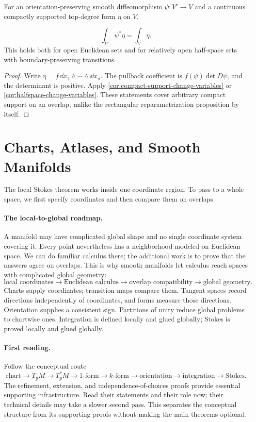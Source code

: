 \begin{proposition}
\label{prop:open-form-invariance}
For an orientation-preserving smooth diffeomorphism $\psi:V'\to V$ and
a continuous compactly supported top-degree form $\eta$ on $V$,

\[
\int_{V'}\psi^*\eta=\int_V\eta.
\]
 This holds both for open Euclidean sets
and for relatively open half-space sets with boundary-preserving transitions.
\end{proposition}
\begin{proof}
Write $\eta=f\,\dd x_1\wedge\cdots\wedge\dd x_n$.
The pullback coefficient is $f(\psi)\det D\psi$, and the determinant is
positive. Apply \cref{cor:compact-support-change-variables} or
\cref{cor:halfspace-change-variables}. These statements cover arbitrary
compact support on an overlap, unlike the rectangular reparametrization
proposition by itself.
\end{proof}

\section{Charts, Atlases, and Smooth Manifolds}
\label{sec:charts-atlases}
The local Stokes theorem works inside one coordinate region. To pass to a
whole space, we first specify coordinates and then compare them on overlaps.

\paragraph{The local-to-global roadmap.}
A manifold may have complicated global shape and no single coordinate
system covering it. Every point nevertheless has a neighborhood modeled
on Euclidean space. We can do familiar calculus there; the additional
work is to prove that the answers agree on overlaps. This is why smooth
manifolds let calculus reach spaces with complicated global geometry:
\[
\text{local coordinates}\to\text{Euclidean calculus}
\to\text{overlap compatibility}\to\text{global geometry}.
\]
Charts supply coordinates; transition maps compare them. Tangent spaces
record directions independently of coordinates, and forms measure those
directions. Orientation supplies a consistent sign. Partitions of unity
reduce global problems to chartwise ones. Integration is defined locally
and glued globally; Stokes is proved locally and glued globally.

\paragraph{First reading.}
Follow the conceptual route
\[
\text{chart}\to T_pM\to T_p^*M\to\text{$1$-form}\to\text{$k$-form}
\to\text{orientation}\to\text{integration}\to\text{Stokes}.
\]
The refinement, extension, and independence-of-choices proofs provide
essential supporting infrastructure. Read their statements and their role
now; their technical details may take a slower second pass. This separates
the conceptual structure from its supporting proofs without making the
main theorems optional.

